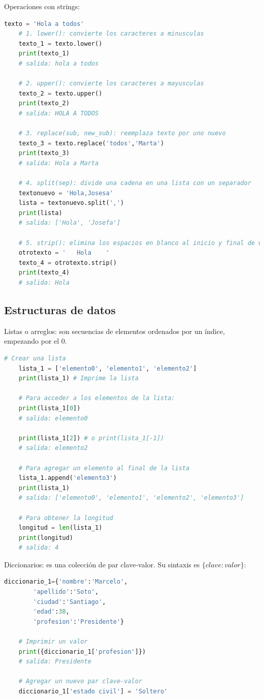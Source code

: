 \documentclass[a4paper, 12pt]{book}
\begin{document}
Operaciones con strings:
\begin{lstlisting}[language=Python]
	texto = 'Hola a todos'
	# 1. lower(): convierte los caracteres a minusculas
	texto_1 = texto.lower()
	print(texto_1)
	# salida: hola a todos
	
	# 2. upper(): convierte los caracteres a mayusculas
	texto_2 = texto.upper()
	print(texto_2)
	# salida: HOLA A TODOS
	
	# 3. replace(sub, new_sub): reemplaza texto por uno nuevo
	texto_3 = texto.replace('todos','Marta')
	print(texto_3)
	# salida: Hola a Marta
	
	# 4. split(sep): divide una cadena en una lista con un separador
	textonuevo = 'Hola,Josesa'
	lista = textonuevo.split(',')
	print(lista)
	# salida: ['Hola', 'Josefa']
	
	# 5. strip(): elimina los espacios en blanco al inicio y final de una cadena
	otrotexto = '	Hola	'
	texto_4 = otrotexto.strip()
	print(texto_4)
	# salida: Hola
\end{lstlisting}

\subsection{Estructuras de datos}
Listas o arreglos: son secuencias de elementos ordenados por un índice, empezando por el 0.
\begin{lstlisting}[language=Python]
	# Crear una lista
	lista_1 = ['elemento0', 'elemento1', 'elemento2']
	print(lista_1) # Imprime la lista
	
	# Para acceder a los elementos de la lista:
	print(lista_1[0])
	# salida: elemento0
	
	print(lista_1[2]) # o print(lista_1[-1])
	# salida: elemento2
	
	# Para agregar un elemento al final de la lista
	lista_1.append('elemento3')
	print(lista_1)
	# salida: ['elemento0', 'elemento1', 'elemento2', 'elemento3']
	
	# Para obtener la longitud
	longitud = len(lista_1)
	print(longitud)
	# salida: 4
\end{lstlisting}

Diccionarios: es una colección de par clave-valor. Su sintaxis es $\{clave: valor\}$:
\begin{lstlisting}[language=Python]
	diccionario_1={'nombre':'Marcelo',
		'apellido':'Soto',
		'ciudad':'Santiago',
		'edad':38,
		'profesion':'Presidente'}
	
	# Imprimir un valor
	print({diccionario_1['profesion']})
	# salida: Presidente
	
	# Agregar un nuevo par clave-valor
	diccionario_1['estado civil'] = 'Soltero'
\end{lstlisting}
\end{document}
